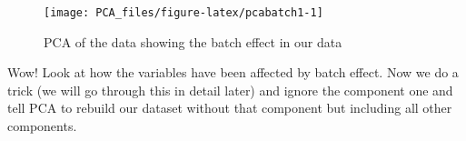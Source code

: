 \documentclass[
]{book}
\newenvironment{Shaded}{\begin{snugshade}}{\end{snugshade}}
\newcommand{\DataTypeTok}[1]{\textcolor[rgb]{0.13,0.29,0.53}{#1}}
\newcommand{\DecValTok}[1]{\textcolor[rgb]{0.00,0.00,0.81}{#1}}
\newcommand{\KeywordTok}[1]{\textcolor[rgb]{0.13,0.29,0.53}{\textbf{#1}}}
\newcommand{\NormalTok}[1]{#1}
\newcommand{\OperatorTok}[1]{\textcolor[rgb]{0.81,0.36,0.00}{\textbf{#1}}}
\newcommand{\StringTok}[1]{\textcolor[rgb]{0.31,0.60,0.02}{#1}}
\theoremstyle{definition}
\theoremstyle{definition}
\theoremstyle{definition}
\theoremstyle{remark}
\begin{document}
\begin{Shaded}
\end{Shaded}

\begin{figure}

{\centering \texttt{[image: PCA\_files/figure-latex/pcabatch1-1]} 

}

\caption{PCA of the data showing the batch effect in our data}\label{fig:pcabatch1}
\end{figure}

Wow! Look at how the variables have been affected by batch effect. Now we do a trick (we will go through this in detail later) and ignore the component one and tell PCA to rebuild our dataset without that component but including all other components.
\end{document}
